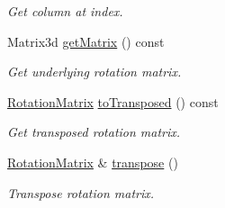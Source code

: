 \begin{DoxyCompactItemize}
\begin{DoxyCompactList}\small\item\em Get column at index. \end{DoxyCompactList}\item 
Matrix3d \hyperlink{classostk_1_1math_1_1geom_1_1d3_1_1trf_1_1rot_1_1_rotation_matrix_a23ca82706923577f771ca33b32298ee2}{get\+Matrix} () const
\begin{DoxyCompactList}\small\item\em Get underlying rotation matrix. \end{DoxyCompactList}\item 
\hyperlink{classostk_1_1math_1_1geom_1_1d3_1_1trf_1_1rot_1_1_rotation_matrix}{Rotation\+Matrix} \hyperlink{classostk_1_1math_1_1geom_1_1d3_1_1trf_1_1rot_1_1_rotation_matrix_a10bcc350ae896982a0939afe1234a86a}{to\+Transposed} () const
\begin{DoxyCompactList}\small\item\em Get transposed rotation matrix. \end{DoxyCompactList}\item 
\hyperlink{classostk_1_1math_1_1geom_1_1d3_1_1trf_1_1rot_1_1_rotation_matrix}{Rotation\+Matrix} \& \hyperlink{classostk_1_1math_1_1geom_1_1d3_1_1trf_1_1rot_1_1_rotation_matrix_aceb59983b55cc27128e0d720bcd4e1af}{transpose} ()
\begin{DoxyCompactList}\small\item\em Transpose rotation matrix. \end{DoxyCompactList}\end{DoxyCompactItemize}
